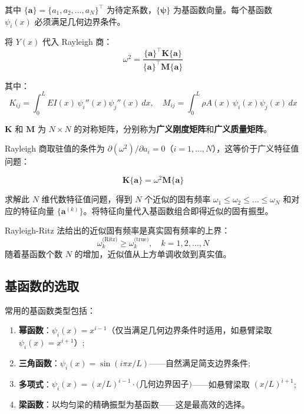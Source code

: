 其中 $\{\mathbf{a}\} = \{a_1, a_2, \dots, a_N\}^{\top}$ 为待定系数，$\{\bm{\psi}\}$ 为基函数向量。每个基函数 $\psi_i(x)$ 必须满足几何边界条件。

将 $Y(x)$ 代入 Rayleigh 商：
\[
\omega^2 = \frac{\{\mathbf{a}\}^{\top}\mathbf{K}\{\mathbf{a}\}}{\{\mathbf{a}\}^{\top}\mathbf{M}\{\mathbf{a}\}}
\]

其中：
\[
K_{ij} = \int_0^L EI(x)\,\psi_i''(x)\psi_j''(x)\,dx, \quad
M_{ij} = \int_0^L \rho A(x)\,\psi_i(x)\psi_j(x)\,dx
\]

$\mathbf{K}$ 和 $\mathbf{M}$ 为 $N\times N$ 的对称矩阵，分别称为\textbf{广义刚度矩阵}和\textbf{广义质量矩阵}。

Rayleigh 商取驻值的条件为 $\partial(\omega^2)/\partial a_i = 0$（$i=1,\dots,N$），这等价于广义特征值问题：

\begin{myformula}
\[
\mathbf{K}\{\mathbf{a}\} = \omega^2 \mathbf{M}\{\mathbf{a}\}
\]
\end{myformula}

求解此 $N$ 维代数特征值问题，得到 $N$ 个近似的固有频率 $\omega_1 \le \omega_2 \le \dots \le \omega_N$ 和对应的特征向量 $\{\mathbf{a}^{(k)}\}$。将特征向量代入基函数组合即得近似的固有振型。

\begin{theorem}
Rayleigh-Ritz 法给出的近似固有频率是真实固有频率的上界：
\[
\omega_k^{\text{(Ritz)}} \ge \omega_k^{\text{(true)}}, \quad k=1,2,\dots,N
\]
随着基函数个数 $N$ 的增加，近似值从上方单调收敛到真实值。
\end{theorem}

\subsection{基函数的选取}

常用的基函数类型包括：

\begin{enumerate}
    \item \textbf{幂函数}：$\psi_i(x) = x^{i-1}$（仅当满足几何边界条件时适用，如悬臂梁取 $\psi_i(x)=x^{i+1}$）;
    \item \textbf{三角函数}：$\psi_i(x) = \sin(i\pi x/L)$——自然满足简支边界条件;
    \item \textbf{多项式}：$\psi_i(x) = (x/L)^{i-1}\cdot\text{(几何边界因子)}$——如悬臂梁取 $(x/L)^{i+1}$;
    \item \textbf{梁函数}：以均匀梁的精确振型为基函数——这是最高效的选择。
\end{enumerate}


